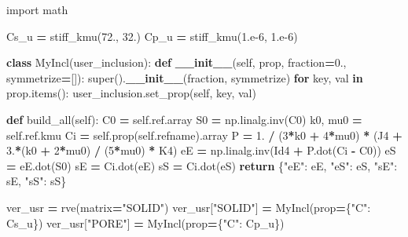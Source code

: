 \documentclass[
  a4paper,
  numbers=noendperiod,
  DIV=12]{scrreprt}
\newenvironment{Shaded}{\begin{snugshade}}{\end{snugshade}}
\newcommand{\BuiltInTok}[1]{#1}
\newcommand{\ControlFlowTok}[1]{\textcolor[rgb]{0.13,0.29,0.53}{\textbf{#1}}}
\newcommand{\DecValTok}[1]{\textcolor[rgb]{0.00,0.00,0.81}{#1}}
\newcommand{\FloatTok}[1]{\textcolor[rgb]{0.00,0.00,0.81}{#1}}
\newcommand{\FunctionTok}[1]{\textcolor[rgb]{0.13,0.29,0.53}{\textbf{#1}}}
\newcommand{\ImportTok}[1]{#1}
\newcommand{\KeywordTok}[1]{\textcolor[rgb]{0.13,0.29,0.53}{\textbf{#1}}}
\newcommand{\NormalTok}[1]{#1}
\newcommand{\OperatorTok}[1]{\textcolor[rgb]{0.81,0.36,0.00}{\textbf{#1}}}
\newcommand{\StringTok}[1]{\textcolor[rgb]{0.31,0.60,0.02}{#1}}
\newcommand{\VariableTok}[1]{\textcolor[rgb]{0.00,0.00,0.00}{#1}}
\begin{document}
\begin{tcolorbox}
\begin{Shaded}
\begin{Highlighting}[]
\ImportTok{import}\NormalTok{ math}

\NormalTok{Cs\_u }\OperatorTok{=}\NormalTok{ stiff\_kmu(}\FloatTok{72.}\NormalTok{, }\FloatTok{32.}\NormalTok{)}
\NormalTok{Cp\_u }\OperatorTok{=}\NormalTok{ stiff\_kmu(}\FloatTok{1.e{-}6}\NormalTok{, }\FloatTok{1.e{-}6}\NormalTok{)}

\KeywordTok{class}\NormalTok{ MyIncl(user\_inclusion):}
    \KeywordTok{def} \FunctionTok{\_\_init\_\_}\NormalTok{(}\VariableTok{self}\NormalTok{, prop, fraction}\OperatorTok{=}\FloatTok{0.}\NormalTok{, symmetrize}\OperatorTok{=}\NormalTok{[]):}
        \BuiltInTok{super}\NormalTok{().}\FunctionTok{\_\_init\_\_}\NormalTok{(fraction, symmetrize)}
        \ControlFlowTok{for}\NormalTok{ key, val }\KeywordTok{in}\NormalTok{ prop.items():}
\NormalTok{            user\_inclusion.set\_prop(}\VariableTok{self}\NormalTok{, key, val)}

    \KeywordTok{def}\NormalTok{ build\_all(}\VariableTok{self}\NormalTok{):}
\NormalTok{        C0      }\OperatorTok{=} \VariableTok{self}\NormalTok{.ref.array}
\NormalTok{        S0      }\OperatorTok{=}\NormalTok{ np.linalg.inv(C0)}
\NormalTok{        k0, mu0 }\OperatorTok{=} \VariableTok{self}\NormalTok{.ref.kmu}
\NormalTok{        Ci }\OperatorTok{=} \VariableTok{self}\NormalTok{.prop(}\VariableTok{self}\NormalTok{.refname).array}
\NormalTok{        P  }\OperatorTok{=} \FloatTok{1.} \OperatorTok{/}\NormalTok{ (}\DecValTok{3}\OperatorTok{*}\NormalTok{k0 }\OperatorTok{+} \DecValTok{4}\OperatorTok{*}\NormalTok{mu0) }\OperatorTok{*}\NormalTok{ (J4 }\OperatorTok{+} \FloatTok{3.}\OperatorTok{*}\NormalTok{(k0 }\OperatorTok{+} \DecValTok{2}\OperatorTok{*}\NormalTok{mu0) }\OperatorTok{/}\NormalTok{ (}\DecValTok{5}\OperatorTok{*}\NormalTok{mu0) }\OperatorTok{*}\NormalTok{ K4)}
\NormalTok{        eE }\OperatorTok{=}\NormalTok{ np.linalg.inv(Id4 }\OperatorTok{+}\NormalTok{ P.dot(Ci }\OperatorTok{{-}}\NormalTok{ C0))}
\NormalTok{        eS }\OperatorTok{=}\NormalTok{ eE.dot(S0)}
\NormalTok{        sE }\OperatorTok{=}\NormalTok{ Ci.dot(eE)}
\NormalTok{        sS }\OperatorTok{=}\NormalTok{ Ci.dot(eS)}
        \ControlFlowTok{return}\NormalTok{ \{}\StringTok{"eE"}\NormalTok{: eE, }\StringTok{"eS"}\NormalTok{: eS, }\StringTok{"sE"}\NormalTok{: sE, }\StringTok{"sS"}\NormalTok{: sS\}}

\NormalTok{ver\_usr }\OperatorTok{=}\NormalTok{ rve(matrix}\OperatorTok{=}\StringTok{"SOLID"}\NormalTok{)}
\NormalTok{ver\_usr[}\StringTok{"SOLID"}\NormalTok{] }\OperatorTok{=}\NormalTok{ MyIncl(prop}\OperatorTok{=}\NormalTok{\{}\StringTok{"C"}\NormalTok{: Cs\_u\})}
\NormalTok{ver\_usr[}\StringTok{"PORE"}\NormalTok{]  }\OperatorTok{=}\NormalTok{ MyIncl(prop}\OperatorTok{=}\NormalTok{\{}\StringTok{"C"}\NormalTok{: Cp\_u\})}


\end{Highlighting}
\end{Shaded}
\end{tcolorbox}
\end{document}
